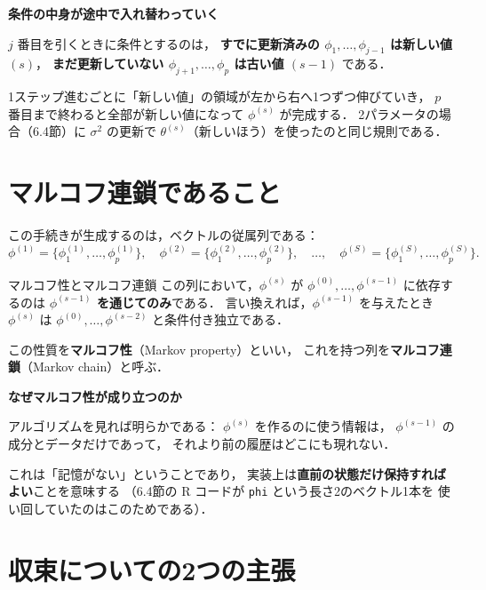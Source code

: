 \documentclass[lualatex,ja=standard,a4paper,12pt]{bxjsarticle}
\begin{document}
\begin{pointbox}
\textbf{条件の中身が途中で入れ替わっていく}

$j$ 番目を引くときに条件とするのは，
\textbf{すでに更新済みの $\phi_1, \ldots, \phi_{j-1}$ は新しい値 $(s)$}，
\textbf{まだ更新していない $\phi_{j+1}, \ldots, \phi_p$ は古い値 $(s-1)$} である．

\medskip
1ステップ進むごとに「新しい値」の領域が左から右へ1つずつ伸びていき，
$p$ 番目まで終わると全部が新しい値になって $\phi^{(s)}$ が完成する．
2パラメータの場合（6.4節）に
$\sigma^2$ の更新で $\theta^{(s)}$（新しいほう）を使ったのと同じ規則である．
\end{pointbox}

\section{マルコフ連鎖であること}

この手続きが生成するのは，ベクトルの従属列である：
\[
  \phi^{(1)} = \{\phi_1^{(1)}, \ldots, \phi_p^{(1)}\}, \quad
  \phi^{(2)} = \{\phi_1^{(2)}, \ldots, \phi_p^{(2)}\}, \quad
  \ldots, \quad
  \phi^{(S)} = \{\phi_1^{(S)}, \ldots, \phi_p^{(S)}\}.
\]

\begin{defbox}{マルコフ性とマルコフ連鎖}
この列において，$\phi^{(s)}$ が
$\phi^{(0)}, \ldots, \phi^{(s-1)}$ に依存するのは
\textbf{$\phi^{(s-1)}$ を通じてのみ}である．
言い換えれば，$\phi^{(s-1)}$ を与えたとき
$\phi^{(s)}$ は $\phi^{(0)}, \ldots, \phi^{(s-2)}$ と条件付き独立である．

\medskip
この性質を\textbf{マルコフ性}（Markov property）といい，
これを持つ列を\textbf{マルコフ連鎖}（Markov chain）と呼ぶ．
\end{defbox}

\begin{pointbox}
\textbf{なぜマルコフ性が成り立つのか}

アルゴリズムを見れば明らかである：
$\phi^{(s)}$ を作るのに使う情報は，
$\phi^{(s-1)}$ の成分とデータだけであって，
それより前の履歴はどこにも現れない．

\medskip
これは「記憶がない」ということであり，
実装上は\textbf{直前の状態だけ保持すればよい}ことを意味する
（6.4節の R コードが \texttt{phi} という長さ2のベクトル1本を
使い回していたのはこのためである）．
\end{pointbox}

\section{収束についての2つの主張}
\end{document}
